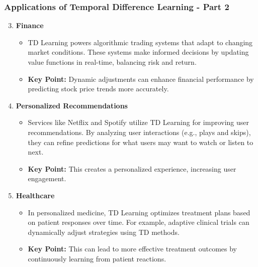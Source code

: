 \documentclass[aspectratio=169]{beamer}
\begin{document}
\begin{frame}[fragile]
  \frametitle{Applications of Temporal Difference Learning - Part 2}
  \begin{enumerate}
    \setcounter{enumi}{2} %
    \item \textbf{Finance}
      \begin{itemize}
        \item TD Learning powers algorithmic trading systems that adapt to changing market conditions. These systems make informed decisions by updating value functions in real-time, balancing risk and return.
        \item \textbf{Key Point:} Dynamic adjustments can enhance financial performance by predicting stock price trends more accurately.
      \end{itemize}

    \item \textbf{Personalized Recommendations}
      \begin{itemize}
        \item Services like Netflix and Spotify utilize TD Learning for improving user recommendations. By analyzing user interactions (e.g., plays and skips), they can refine predictions for what users may want to watch or listen to next.
        \item \textbf{Key Point:} This creates a personalized experience, increasing user engagement.
      \end{itemize}

    \item \textbf{Healthcare}
      \begin{itemize}
        \item In personalized medicine, TD Learning optimizes treatment plans based on patient responses over time. For example, adaptive clinical trials can dynamically adjust strategies using TD methods.
        \item \textbf{Key Point:} This can lead to more effective treatment outcomes by continuously learning from patient reactions.
      \end{itemize}
  \end{enumerate}
\end{frame}
\end{document}
